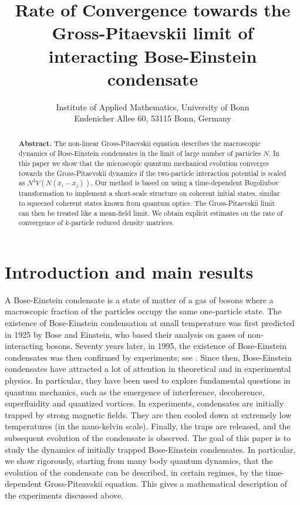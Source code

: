 \documentclass[11pt,a4paper,DIV11]{scrartcl}	%
\author{Institute of Applied Mathematics, University of Bonn\\ Endenicher Allee 60, 53115 Bonn, Germany}
\title{Rate of Convergence towards the Gross-Pitaevskii limit of interacting Bose-Einstein condensate}
\begin{document}
\maketitle

\begin{abstract}
\textbf{\sffamily Abstract.} The non-linear Gross-Pitaevskii equation describes the macroscopic dynamics of Bose-Einstein condensates in the limit of large number of particles $N$. In this paper we show that the microscopic quantum mechanical evolution converges towards the Gross-Pitaevskii dynamics if the two-particle interaction potential is scaled as $N^3 V(N(x_i-x_j))$. 
Our method is based on using a time-dependent Bogoliubov transformation to implement a short-scale structure on coherent initial states, similar to squeezed coherent states known from quantum optics. The Gross-Pitaevskii limit can then be treated like a mean-field limit. We obtain explicit estimates on the rate of convergence of $k$-particle reduced density matrices.
\end{abstract}

\section{Introduction and main results}
\label{s:intro}


A Bose-Einstein condensate is a state of matter of a gas of bosons where a macroscopic fraction of the particles occupy the same one-particle state. The existence of Bose-Einstein condensation at small temperature was first predicted in 1925 by Bose and Einstein, who based their analysis on gases of non-interacting bosons. Seventy years later, in 1995, the existence of Bose-Einstein condensates 
was then confirmed by experiments; see \cite{BEC1,BEC2}. Since then, Bose-Einstein condensates have attracted a lot of attention in theoretical and in experimental physics. In particular, they have been used to explore fundamental questions in quantum mechanics, such as the emergence of interference, decoherence, superfluidity and quantized vortices. In experiments, condensates are initially trapped by strong magnetic fields. They are then cooled down at extremely low temperatures (in the nano-kelvin scale). Finally, the traps are released, and the subsequent evolution of the condensate is observed. The goal of this paper is to study the dynamics of initially trapped Bose-Einstein condensates. In particular, we 
show rigorously, starting from many body quantum dynamics, that the evolution of the condensate can be described, in certain regimes, by the time-dependent Gross-Piteavskii equation. This gives a mathematical description of the experiments discussed above.
\end{document}

